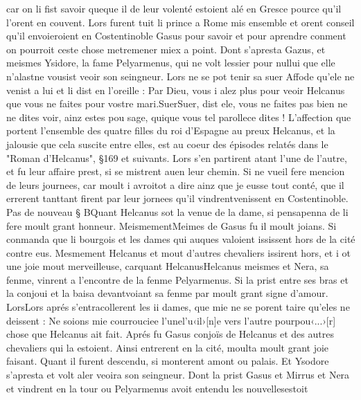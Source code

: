 \documentclass{article}
\begin{document}
\begin{pages}
   car on li fist savoir queque il de leur volenté estoient alé en 
   Gresce pource qu’il l’orent en couvent. 
   Lors furent tuit li prince a Rome mis ensemble et orent conseil qu’il envoieroient en 
   Costentinoble Gasus pour savoir et 
   pour aprendre conment on pourroit ceste chose metremener miex a point. 
   Dont s’apresta Gazus, 
   et meismes Ysidore, la fame Pelyarmenus, 
   qui ne volt lessier pour nullui que elle n’alastne vousist 
   veoir son seingneur. 
   Lors ne se pot tenir sa suer Affode qu’ele ne venist a lui et li dist en l’oreille :
   Par Dieu, vous i alez plus pour veoir 
      Helcanus que vous ne faites pour vostre mari.SuerSuer, dist ele, 
      vous ne faites pas bien ne 
      ne dites voir, ainz estes pou sage, 
      quique vous 
      tel parollece dites !
   L'affection que portent l'ensemble des quatre filles du roi d'Espagne au preux Helcanus, et la jalousie
   que cela suscite entre elles, est au coeur des épisodes relatés dans le "Roman d'Helcanus", §169 et suivants.
   Lors s’en partirent atant l’une de l’autre, et fu leur affaire prest, si se mistrent 
   auen leur chemin. 
   Si ne vueil fere mencion de leurs journees, 
      car moult i avroitot a dire 
      ainz que je eusse tout conté, 
      que il errerent 
   tanttant firent par leur jornees 
   qu’il vindrentvenissent 
   en Costentinoble. \pend
\pstart Pas de nouveau § BQuant 
   Helcanus sot la venue de la dame, 
   si pensapenna de li fere moult grant honneur. 
   MeismementMeimes de 
   Gasus fu il moult joians. 
   Si conmanda que li bourgois et les dames qui auques valoient ississent hors de la cité 
   contre eus. Mesmement Helcanus 
   et mout d’autres chevaliers issirent hors, et i ot une joie mout merveilleuse, 
   carquant 
   HelcanusHelcanus meismes et 
   Nera, 
   sa fenme, vinrent a l’encontre de la fenme Pelyarmenus. 
   Si la prist entre ses bras et la conjoui et la baisa devantvoiant 
   sa fenme par moult grant signe d’amour. 
   LorsLors aprés s’entracollerent les ii dames, 
   que mie ne se porent taire qu’eles ne deissent :
   Ne soions mie courrouciee l’unel’u‹il›[n]e 
      vers l’autre pourpou‹...›[r] chose que 
   Helcanus ait fait. \pend
\pstart Aprés fu Gasus conjoïs de 
   Helcanus et des autres chevaliers qui la estoient. 
   Ainsi entrerent en la cité, 
   moulta moult grant joie 
   faisant. 
   Quant il furent descendu, si monterent amont ou palais. Et Ysodore s’apresta et 
   volt aler veoira son seingneur. 
   Dont la prist Gasus et 
   Mirrus et Nera et vindrent en la tour ou 
   Pelyarmenus avoit entendu les nouvellesestoit 

\end{pages}
\end{document}
